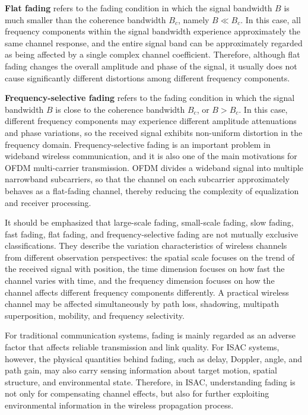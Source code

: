 \textbf{Flat fading} refers to the fading condition in which the signal bandwidth \(B\)
is much smaller than the coherence bandwidth \(B_c\),
namely \(B \ll B_c\).
In this case,
all frequency components within the signal bandwidth experience approximately the same channel response,
and the entire signal band can be approximately regarded as being affected by a single complex channel coefficient.
Therefore,
although flat fading changes the overall amplitude and phase of the signal,
it usually does not cause significantly different distortions among different frequency components.

\textbf{Frequency-selective fading} refers to the fading condition in which the signal bandwidth \(B\)
is close to the coherence bandwidth \(B_c\),
or \(B > B_c\).
In this case,
different frequency components may experience different amplitude attenuations and phase variations,
so the received signal exhibits non-uniform distortion in the frequency domain.
Frequency-selective fading is an important problem in wideband wireless communication,
and it is also one of the main motivations for OFDM multi-carrier transmission.
OFDM divides a wideband signal into multiple narrowband subcarriers,
so that the channel on each subcarrier approximately behaves as a flat-fading channel,
thereby reducing the complexity of equalization and receiver processing.

It should be emphasized that large-scale fading,
small-scale fading,
slow fading,
fast fading,
flat fading,
and frequency-selective fading are not mutually exclusive classifications.
They describe the variation characteristics of wireless channels from different observation perspectives:
the spatial scale focuses on the trend of the received signal with position,
the time dimension focuses on how fast the channel varies with time,
and the frequency dimension focuses on how the channel affects different frequency components differently.
A practical wireless channel may be affected simultaneously by path loss,
shadowing,
multipath superposition,
mobility,
and frequency selectivity.

For traditional communication systems,
fading is mainly regarded as an adverse factor that affects reliable transmission and link quality.
For ISAC systems,
however,
the physical quantities behind fading,
such as delay,
Doppler,
angle,
and path gain,
may also carry sensing information about target motion,
spatial structure,
and environmental state.
Therefore,
in ISAC,
understanding fading is not only for compensating channel effects,
but also for further exploiting environmental information in the wireless propagation process.

